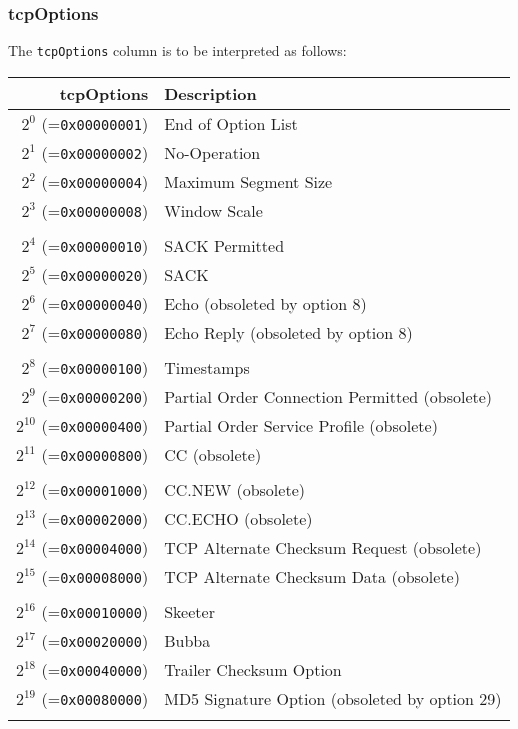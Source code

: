 \documentclass[documentation]{subfiles}
\begin{document}
\subsubsection{tcpOptions}\label{tcpOptions}
The {\tt tcpOptions} column is to be interpreted as follows:
\begin{longtable}{rl}
    \toprule
    {\bf tcpOptions} & {\bf Description}\\
    \midrule\endhead%
    $2^{0}$  (={\tt 0x00000001}) & End of Option List\\
    $2^{1}$  (={\tt 0x00000002}) & No-Operation\\
    $2^{2}$  (={\tt 0x00000004}) & Maximum Segment Size\\
    $2^{3}$  (={\tt 0x00000008}) & Window Scale\\\\
    $2^{4}$  (={\tt 0x00000010}) & SACK Permitted\\
    $2^{5}$  (={\tt 0x00000020}) & SACK\\
    $2^{6}$  (={\tt 0x00000040}) & Echo (obsoleted by option 8)\\
    $2^{7}$  (={\tt 0x00000080}) & Echo Reply (obsoleted by option 8)\\\\
    $2^{8}$  (={\tt 0x00000100}) & Timestamps\\
    $2^{9}$  (={\tt 0x00000200}) & Partial Order Connection Permitted (obsolete)\\
    $2^{10}$ (={\tt 0x00000400}) & Partial Order Service Profile (obsolete)\\
    $2^{11}$ (={\tt 0x00000800}) & CC (obsolete)\\\\
    $2^{12}$ (={\tt 0x00001000}) & CC.NEW (obsolete)\\
    $2^{13}$ (={\tt 0x00002000}) & CC.ECHO (obsolete)\\
    $2^{14}$ (={\tt 0x00004000}) & TCP Alternate Checksum Request (obsolete)\\
    $2^{15}$ (={\tt 0x00008000}) & TCP Alternate Checksum Data (obsolete)\\\\
    $2^{16}$ (={\tt 0x00010000}) & Skeeter\\
    $2^{17}$ (={\tt 0x00020000}) & Bubba\\
    $2^{18}$ (={\tt 0x00040000}) & Trailer Checksum Option\\
    $2^{19}$ (={\tt 0x00080000}) & MD5 Signature Option (obsoleted by option 29)\\\\

\end{longtable}
\end{document}
